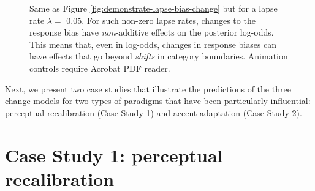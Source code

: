 \documentclass[
  11pt,
  man,floatsintext]{apa6}
\begin{document}
\begin{figure}

{\centering {}

}

\caption[Same as Figure \ref{fig:demonstrate-lapse-bias-change} but for a lapse rate \(\lambda=\) 0.05. For such non-zero lapse rates, changes to the response bias have \emph{non}-additive effects on the posterior log-odds. This means that, even in log-odds, changes in response biases can have effects that go beyond \emph{shifts} in category boundaries. Animation controls require Acrobat PDF reader.]{Same as Figure \ref{fig:demonstrate-lapse-bias-change} but for a lapse rate \(\lambda=\) 0.05. For such non-zero lapse rates, changes to the response bias have \emph{non}-additive effects on the posterior log-odds. This means that, even in log-odds, changes in response biases can have effects that go beyond \emph{shifts} in category boundaries. Animation controls require Acrobat PDF reader.}\label{fig:demonstrate-lapse-bias-change-nonzero-lapse}
\end{figure}

Next, we present two case studies that illustrate the predictions of the three change models for two types of paradigms that have been particularly influential: perceptual recalibration (Case Study 1) and accent adaptation (Case Study 2).

\hypertarget{case-study-1-perceptual-recalibration}{%
\section{Case Study 1: perceptual recalibration}\label{case-study-1-perceptual-recalibration}}
\end{document}

